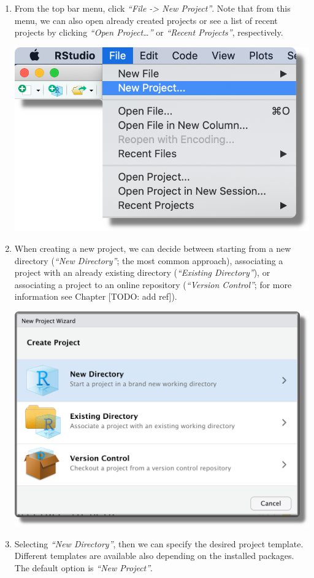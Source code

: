 \documentclass[
  11pt,
]{book}
\begin{document}
\begin{enumerate}
\def\labelenumi{\arabic{enumi}.}
\item
  From the top bar menu, click \emph{``File -\textgreater{} New Project''}. Note that from this menu, we can also open already created projects or see a list of recent projects by clicking \emph{``Open Project\ldots{}''} or \emph{``Recent Projects''}, respectively.

  \begin{center}\includegraphics[width=0.6\linewidth]{images/projects/new-proj-1} \end{center}
\item
  When creating a new project, we can decide between starting from a new directory (\emph{``New Directory''}; the most common approach), associating a project with an already existing directory (\emph{``Existing Directory''}), or associating a project to an online repository (\emph{``Version Control''}; for more information see Chapter {[}TODO: add ref{]}).

  \begin{center}\includegraphics[width=0.6\linewidth]{images/projects/new-proj-2} \end{center}
\item
  Selecting \emph{``New Directory''}, then we can specify the desired project template. Different templates are available also depending on the installed packages. The default option is \emph{``New Project''}.


\end{enumerate}
\end{document}
